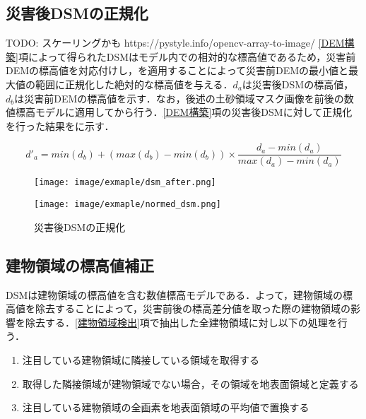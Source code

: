    \subsection{災害後DSMの正規化}
      \label{災害後DSMの正規化}
      TODO: スケーリングかも
      https://pystyle.info/opencv-array-to-image/
      \ref{DEM構築}項によって得られたDSMはモデル内での相対的な標高値であるため，災害前DEMの標高値を対応付けし，を適用することによって災害前DEMの最小値と最大値の範囲に正規化した絶対的な標高値を与える．$d_{a}$は災害後DSMの標高値，$d_{b}$は災害前DEMの標高値を示す．なお，後述の土砂領域マスク画像を前後の数値標高モデルに適用してから行う．\ref{DEM構築}項の災害後DSMに対して正規化を行った結果をに示す．

      \begin{equation}
        \label{正規化}
        d'_{a} =  
          min(d_{b}) + (max(d_{b}) - min(d_{b})) \times
          \dfrac{d_{a} - min(d_{a})} {max(d_{a}) - min(d_{a})}
      \end{equation}

      \begin{figure}[tbp]
        \begin{minipage}[c]{0.5\hsize}
          \centering
          \texttt{[image: image/exmaple/dsm\_after.png]}
        \end{minipage}
        \begin{minipage}[c]{0.5\hsize}
          \centering
          \texttt{[image: image/exmaple/normed\_dsm.png]}
        \end{minipage}
        \caption{災害後DSMの正規化}
        \label{災害後DSMの正規化結果}
      \end{figure}


    \subsection{建物領域の標高値補正}
      DSMは建物領域の標高値を含む数値標高モデルである．よって，建物領域の標高値を除去することによって，災害前後の標高差分値を取った際の建物領域の影響を除去する．\ref{建物領域検出}項で抽出した全建物領域に対し以下の処理を行う．

      \begin{enumerate}
        \setlength{\itemsep}{-5pt}
        \item 注目している建物領域に隣接している領域を取得する
        \item 取得した隣接領域が建物領域でない場合，その領域を地表面領域と定義する
        \item 注目している建物領域の全画素を地表面領域の平均値で置換する
      \end{enumerate}

